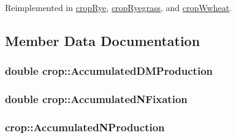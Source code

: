 Reimplemented in \hyperlink{classcrop_rye_ad2996d19a34c3a800f1f356b522b4904}{cropRye}, \hyperlink{classcrop_ryegrass_a73b6ee5b772c6748d37be7d006a092c6}{cropRyegrass}, and \hyperlink{classcrop_wwheat_a42da6f7e2539c75a2171f2dae571257f}{cropWwheat}.

\subsection{Member Data Documentation}
\hypertarget{classcrop_ac9e8384797116e758558faff120ae56d}{
\subsubsection[{AccumulatedDMProduction}]{\setlength{\rightskip}{0pt plus 5cm}double {\bf crop::AccumulatedDMProduction}}}
\label{classcrop_ac9e8384797116e758558faff120ae56d}
\hypertarget{classcrop_ad4c7a7759997919efa9c9befb53cab69}{
\subsubsection[{AccumulatedNFixation}]{\setlength{\rightskip}{0pt plus 5cm}double {\bf crop::AccumulatedNFixation}}}
\label{classcrop_ad4c7a7759997919efa9c9befb53cab69}
\hypertarget{classcrop_ac99038132c4676e35b98265edb34a213}{
\subsubsection[{AccumulatedNProduction}]{ {\bf crop::AccumulatedNProduction}}}
\label{classcrop_ac99038132c4676e35b98265edb34a213}


